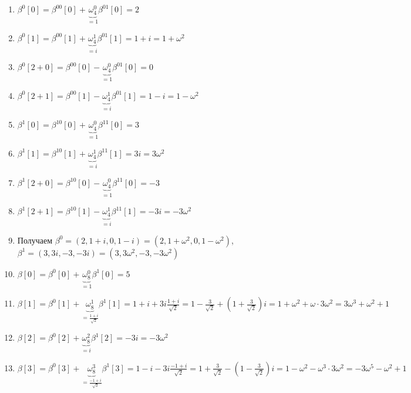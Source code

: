 \documentclass[a4paper]{article}
\begin{document}
\begin{enumerate}
\begin{enumerate}
\item $\beta^0[0]=\beta^{00}[0]+\underbrace{\omega_4^0}_{=1}\beta^{01}[0]=2$
\item $\beta^0[1]=\beta^{00}[1]+\underbrace{\omega_4^1}_{=i}\beta^{01}[1]=1+i=1+\omega^2$
\item $\beta^0[2+0]=\beta^{00}[0]-\underbrace{\omega_4^0}_{=1}\beta^{01}[0]=0$
\item $\beta^0[2+1]=\beta^{00}[1]-\underbrace{\omega_4^1}_{=i}\beta^{01}[1]=1-i=1-\omega^2$
\item $\beta^1[0]=\beta^{10}[0]+\underbrace{\omega_4^0}_{=1}\beta^{11}[0]=3$
\item $\beta^1[1]=\beta^{10}[1]+\underbrace{\omega_4^1}_{=i}\beta^{11}[1]=3i=3\omega^2$
\item $\beta^1[2+0]=\beta^{10}[0]-\underbrace{\omega_4^0}_{=1}\beta^{11}[0]=-3$
\item $\beta^1[2+1]=\beta^{10}[1]-\underbrace{\omega_4^1}_{=i}\beta^{11}[1]=-3i=-3\omega^2$
\item Получаем $\beta^0=(2,1+i,0,1-i)=(2,1+\omega^2,0,1-\omega^2)$, $\beta^1=(3,3i,-3,-3i)=(3,3\omega^2,-3,-3\omega^2)$
\item $\beta[0]=\beta^0[0]+\underbrace{\omega_8^0}_{=1}\beta^1[0]=5$
\item $\beta[1]=\beta^0[1]+\underbrace{\omega_8^1}_{=\frac{1+i}{\sqrt{2}}}\beta^1[1]=1+i+3i\frac{1+i}{\sqrt{2}}=1-\frac{3}{\sqrt{2}}+(1+\frac{3}{\sqrt{2}})i=1+\omega^2+\omega\cdot 3\omega^2=3\omega^3+\omega^2+1$
\item $\beta[2]=\beta^0[2]+\underbrace{\omega_8^2}_{=i}\beta^1[2]=-3i=-3\omega^2$
\item $\beta[3]=\beta^0[3]+\underbrace{\omega_8^3}_{=\frac{-1+i}{\sqrt{2}}}\beta^1[3]=1-i-3i\frac{-1+i}{\sqrt{2}}=1+\frac{3}{\sqrt{2}}-(1-\frac{3}{\sqrt{2}})i=1-\omega^2-\omega^3\cdot 3\omega^2=-3\omega^5-\omega^2+1$


\end{enumerate}
\end{enumerate}
\end{document}
